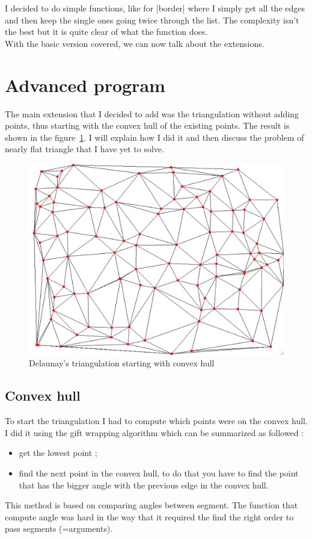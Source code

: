\documentclass[a4paper,11pt]{article}%
\begin{document}
I decided to do simple functions, like for |border| where I simply get all the edges and then keep the single ones going twice through the list. The complexity isn't the best but it is quite clear of what the function does. \\


With the basic version covered, we can now talk about the extensions.



\section{Advanced program}

The main extension that I decided to add was the triangulation without adding points, thus starting with the convex hull of the existing points. The result is shown in the figure~\ref{fig:good}. I will explain how I did it and then discuss the problem of nearly flat triangle that I have yet to solve.

\begin{figure}[H]
	\begin{center}
		\includegraphics[scale=0.3]{convexhull-good.png}
	\end{center}
	\caption{Delaunay's triangulation starting with convex hull}
	\label{fig:good}
\end{figure}

\subsection{Convex hull}
To start the triangulation I had to compute which points were on the convex hull. I did it using the gift wrapping algorithm which can be summarized as followed : 
\begin{itemize}
	\item get the lowest point ;
	\item find the next point in the convex hull, to do that you have to find the point that has the bigger angle with the previous edge in the convex hull.
\end{itemize}
This method is based on comparing angles between segment. The function that compute angle was hard in the way that it required the find the right order to pass segments (=arguments).
\end{document}
